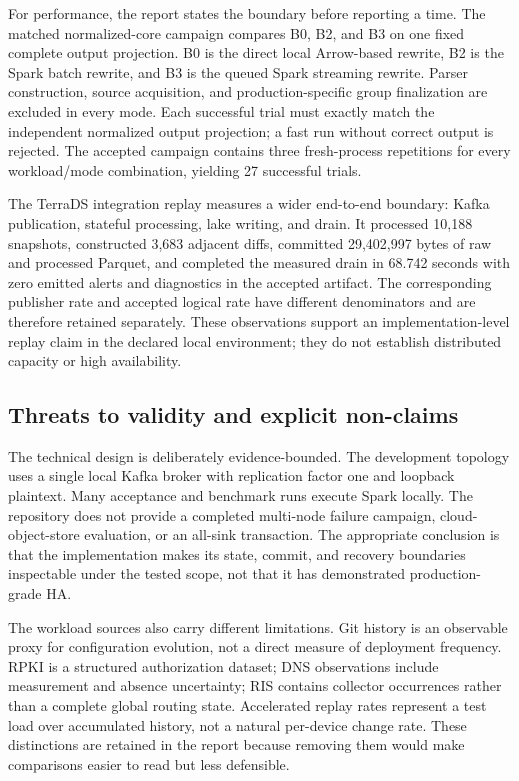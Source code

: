 For performance, the report states the boundary before reporting a time. The matched normalized-core campaign compares B0, B2, and B3 on one fixed complete output projection. B0 is the direct local Arrow-based rewrite, B2 is the Spark batch rewrite, and B3 is the queued Spark streaming rewrite. Parser construction, source acquisition, and production-specific group finalization are excluded in every mode. Each successful trial must exactly match the independent normalized output projection; a fast run without correct output is rejected. The accepted campaign contains three fresh-process repetitions for every workload/mode combination, yielding 27 successful trials.

The TerraDS integration replay measures a wider end-to-end boundary: Kafka publication, stateful processing, lake writing, and drain. It processed 10,188 snapshots, constructed 3,683 adjacent diffs, committed 29,402,997 bytes of raw and processed Parquet, and completed the measured drain in 68.742 seconds with zero emitted alerts and diagnostics in the accepted artifact. The corresponding publisher rate and accepted logical rate have different denominators and are therefore retained separately. These observations support an implementation-level replay claim in the declared local environment; they do not establish distributed capacity or high availability.

\subsection{Threats to validity and explicit non-claims}

The technical design is deliberately evidence-bounded. The development topology uses a single local Kafka broker with replication factor one and loopback plaintext. Many acceptance and benchmark runs execute Spark locally. The repository does not provide a completed multi-node failure campaign, cloud-object-store evaluation, or an all-sink transaction. The appropriate conclusion is that the implementation makes its state, commit, and recovery boundaries inspectable under the tested scope, not that it has demonstrated production-grade HA.

The workload sources also carry different limitations. Git history is an observable proxy for configuration evolution, not a direct measure of deployment frequency. RPKI is a structured authorization dataset; DNS observations include measurement and absence uncertainty; RIS contains collector occurrences rather than a complete global routing state. Accelerated replay rates represent a test load over accumulated history, not a natural per-device change rate. These distinctions are retained in the report because removing them would make comparisons easier to read but less defensible.

